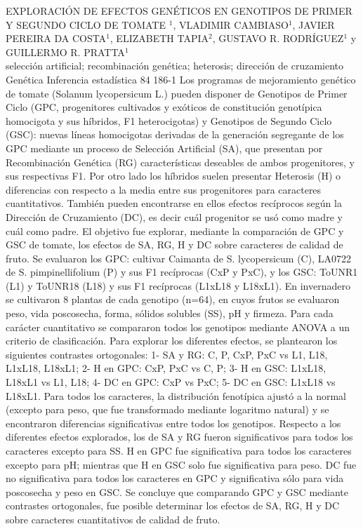 \A
{EXPLORACIÓN DE EFECTOS GENÉTICOS EN GENOTIPOS DE PRIMER Y SEGUNDO CICLO DE TOMATE}
{$^1$, VLADIMIR CAMBIASO$^1$, JAVIER PEREIRA DA COSTA$^1$, ELIZABETH TAPIA$^2$, GUSTAVO R. RODRÍGUEZ$^1$ y GUILLERMO R. PRATTA$^1$}
{
\\}
{selección artificial; recombinación genética; heterosis; dirección de cruzamiento} 
 {Genética} 
 {Inferencia estadística} 
 {84} 
 {186-1}
{Los programas de mejoramiento genético de tomate (Solanum lycopersicum L.) pueden disponer de Genotipos de Primer Ciclo (GPC, progenitores cultivados y exóticos de constitución genotípica homocigota y sus híbridos, F1 heterocigotas) y Genotipos de Segundo Ciclo (GSC): nuevas líneas homocigotas derivadas de la generación segregante de los GPC mediante un proceso de Selección Artificial (SA), que presentan por Recombinación Genética (RG) características deseables de ambos progenitores, y sus respectivas F1. Por otro lado los híbridos suelen presentar Heterosis (H) o diferencias con respecto a la media entre sus progenitores para caracteres cuantitativos. También pueden encontrarse en ellos efectos recíprocos según la Dirección de Cruzamiento (DC), es decir cuál progenitor se usó como madre y cuál como padre. El objetivo fue explorar, mediante la comparación de GPC y GSC de tomate, los efectos de SA, RG, H y DC sobre caracteres de calidad de fruto. Se evaluaron los GPC: cultivar Caimanta de S. lycopersicum (C), LA0722 de S. pimpinellifolium (P) y sus F1 recíprocas (CxP y PxC), y los GSC: ToUNR1 (L1) y ToUNR18 (L18) y sus F1 recíprocas (L1xL18 y L18xL1). En invernadero se cultivaron 8 plantas de cada genotipo (n=64), en cuyos frutos se evaluaron peso, vida poscosecha, forma, sólidos solubles (SS), pH y firmeza. Para cada carácter cuantitativo se compararon todos los genotipos mediante ANOVA a un criterio de clasificación. Para explorar los diferentes efectos, se plantearon los siguientes contrastes ortogonales: 1- SA y RG: C, P, CxP, PxC vs L1, L18, L1xL18, L18xL1; 2- H en GPC: CxP, PxC vs C, P; 3- H en GSC: L1xL18, L18xL1 vs L1, L18; 4- DC en GPC: CxP vs PxC; 5- DC en GSC: L1xL18 vs L18xL1. Para todos los caracteres, la distribución fenotípica ajustó a la normal (excepto para peso, que fue transformado mediante logaritmo natural) y se encontraron diferencias significativas entre todos los genotipos. Respecto a los diferentes efectos explorados, los de SA y RG fueron significativos para todos los caracteres excepto para SS. H en GPC fue significativa para todos los caracteres excepto para pH; mientras que H en GSC solo fue significativa para peso. DC fue no significativa para todos los caracteres en GPC y significativa sólo para vida poscosecha y peso en GSC. Se concluye que comparando GPC y GSC mediante contrastes ortogonales, fue posible determinar los efectos de SA, RG, H y DC sobre caracteres cuantitativos de calidad de fruto.}
